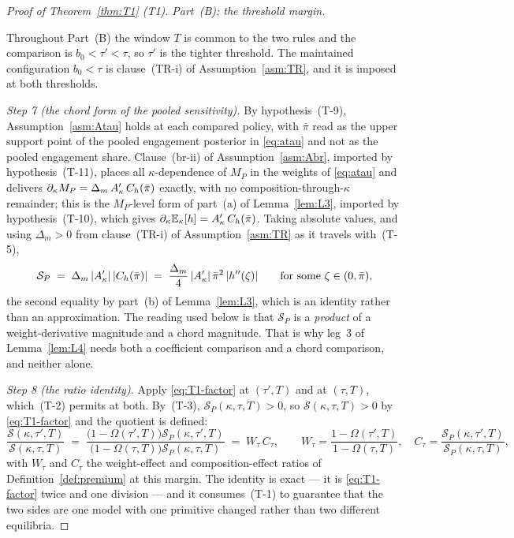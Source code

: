 \begin{proof}[Proof of Theorem~\ref{thm:T1} (T1)]
\medskip
\noindent\emph{Part~(B): the threshold margin.}

Throughout Part~(B) the window $T$ is common to the two rules and the comparison is
$b_0 < \tau' < \tau$, so $\tau'$ is the tighter threshold. The maintained configuration
$b_0 < \tau$ is clause~(TR-i) of Assumption~\ref{asm:TR}, and it is imposed at both thresholds.

\emph{Step 7 (the chord form of the pooled sensitivity).} By hypothesis~(T-9),
Assumption~\ref{asm:Atau} holds at each compared policy, with $\bar\pi$ read as the upper support
point of the pooled engagement posterior in \eqref{eq:atau} and not as the pooled engagement share.
Clause~(br-ii) of Assumption~\ref{asm:Abr}, imported by hypothesis~(T-11), places all
$\kappa$-dependence of $M_P$ in the weights of \eqref{eq:atau} and delivers
$\partial_\kappa M_P = \Delta_m\,A'_{\kappa}\,C_h(\bar\pi)$ exactly, with no
composition-through-$\kappa$ remainder; this is the $M_P$-level form of part~(a) of
Lemma~\ref{lem:L3}, imported by hypothesis~(T-10), which gives
$\partial_\kappa\mathbb{E}_\kappa[h] = A'_{\kappa}\,C_h(\bar\pi)$. Taking absolute values, and using
$\Delta_m > 0$ from clause~(TR-i) of Assumption~\ref{asm:TR} as it travels with~(T-5),
\begin{equation}
\label{eq:T1-chord}
\mathcal S_P \;=\; \Delta_m\,\lvert A'_{\kappa}\rvert\,\lvert C_h(\bar\pi)\rvert
\;=\; \frac{\Delta_m}{4}\,\lvert A'_{\kappa}\rvert\,\bar\pi^2\,\lvert h''(\zeta)\rvert
\qquad\text{for some }\zeta\in(0,\bar\pi),
\end{equation}
the second equality by part~(b) of Lemma~\ref{lem:L3}, which is an identity rather than an
approximation. The reading used below is that $\mathcal S_P$ is a \emph{product} of a
weight-derivative magnitude and a chord magnitude. That is why leg~3 of Lemma~\ref{lem:L4} needs
both a coefficient comparison and a chord comparison, and neither alone.

\emph{Step 8 (the ratio identity).} Apply \eqref{eq:T1-factor} at $(\tau',T)$ and at $(\tau,T)$,
which~(T-2) permits at both. By~(T-3), $\mathcal S_P(\kappa,\tau,T) > 0$, so
$\mathcal S(\kappa,\tau,T) > 0$ by \eqref{eq:T1-factor} and the quotient is defined:
\begin{equation}
\label{eq:T1-ratio-tau}
\frac{\mathcal S(\kappa,\tau',T)}{\mathcal S(\kappa,\tau,T)}
\;=\; \frac{\bigl(1-\Omega(\tau',T)\bigr)\mathcal S_P(\kappa,\tau',T)}
            {\bigl(1-\Omega(\tau,T)\bigr)\mathcal S_P(\kappa,\tau,T)}
\;=\; W_\tau\,C_\tau,
\qquad
W_\tau = \frac{1-\Omega(\tau',T)}{1-\Omega(\tau,T)},\quad
C_\tau = \frac{\mathcal S_P(\kappa,\tau',T)}{\mathcal S_P(\kappa,\tau,T)},
\end{equation}
with $W_\tau$ and $C_\tau$ the weight-effect and composition-effect ratios of
Definition~\ref{def:premium} at this margin. The identity is exact --- it is
\eqref{eq:T1-factor} twice and one division --- and it consumes~(T-1) to guarantee that the two
sides are one model with one primitive changed rather than two different equilibria.


\end{proof}
